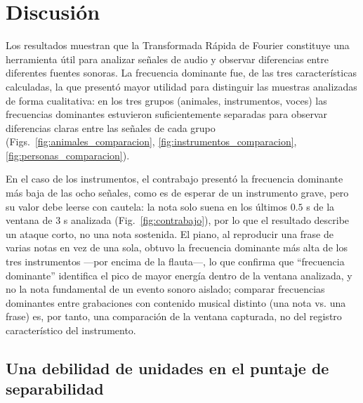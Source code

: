 
\section{Discusión}

Los resultados muestran que la Transformada Rápida de Fourier constituye una herramienta útil para analizar señales de audio y observar diferencias entre diferentes fuentes sonoras. La frecuencia dominante fue, de las tres características calculadas, la que presentó mayor utilidad para distinguir las muestras analizadas de forma cualitativa: en los tres grupos (animales, instrumentos, voces) las frecuencias dominantes estuvieron suficientemente separadas para observar diferencias claras entre las señales de cada grupo (Figs.~\ref{fig:animales_comparacion}, \ref{fig:instrumentos_comparacion}, \ref{fig:personas_comparacion}).

En el caso de los instrumentos, el contrabajo presentó la frecuencia dominante más baja de las ocho señales, como es de esperar de un instrumento grave, pero su valor debe leerse con cautela: la nota solo suena en los últimos $0.5$ s de la ventana de $3$ s analizada (Fig.~\ref{fig:contrabajo}), por lo que el resultado describe un ataque corto, no una nota sostenida. El piano, al reproducir una frase de varias notas en vez de una sola, obtuvo la frecuencia dominante más alta de los tres instrumentos —por encima de la flauta—, lo que confirma que ``frecuencia dominante'' identifica el pico de mayor energía dentro de la ventana analizada, y no la nota fundamental de un evento sonoro aislado; comparar frecuencias dominantes entre grabaciones con contenido musical distinto (una nota vs. una frase) es, por tanto, una comparación de la ventana capturada, no del registro característico del instrumento.

\subsection{Una debilidad de unidades en el puntaje de separabilidad}
\label{sec:discusion-unidades}

